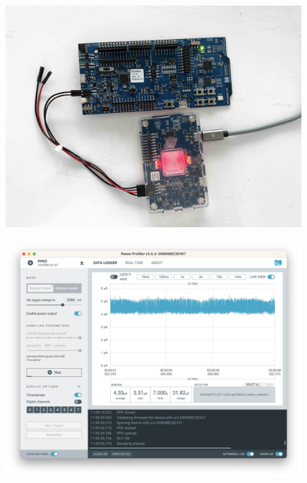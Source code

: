 \begin{figure}[h]
    \centering
    \begin{minipage}[t]{0.45\textwidth}
        \centering
        \includegraphics[width=1\linewidth]{images/research_design/PPK2_Router.jpg}
        \label{fig:router_source_meter}
    \end{minipage}\hfill
    \begin{minipage}[t]{0.45\textwidth}
        \centering
        \includegraphics[width=1\linewidth]{images/research_design/PPK2_SDK.jpg}
        \label{fig:ppk2_source_meter}
    \end{minipage}
\end{figure}

